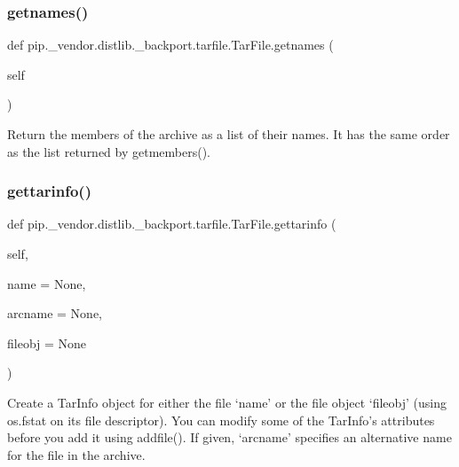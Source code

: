 \subsubsection{\texorpdfstring{getnames()}{getnames()}}
{\footnotesize\ttfamily def pip.\+\_\+vendor.\+distlib.\+\_\+backport.\+tarfile.\+Tar\+File.\+getnames (\begin{DoxyParamCaption}\item[{}]{self }\end{DoxyParamCaption})}

\begin{DoxyVerb}Return the members of the archive as a list of their names. It has
   the same order as the list returned by getmembers().
\end{DoxyVerb}
 \mbox{\label{classpip_1_1__vendor_1_1distlib_1_1__backport_1_1tarfile_1_1TarFile_aa64c5b98909e7c3064cbb52e5025794e}} 
\subsubsection{\texorpdfstring{gettarinfo()}{gettarinfo()}}
{\footnotesize\ttfamily def pip.\+\_\+vendor.\+distlib.\+\_\+backport.\+tarfile.\+Tar\+File.\+gettarinfo (\begin{DoxyParamCaption}\item[{}]{self,  }\item[{}]{name = {\ttfamily None},  }\item[{}]{arcname = {\ttfamily None},  }\item[{}]{fileobj = {\ttfamily None} }\end{DoxyParamCaption})}

\begin{DoxyVerb}Create a TarInfo object for either the file `name' or the file
   object `fileobj' (using os.fstat on its file descriptor). You can
   modify some of the TarInfo's attributes before you add it using
   addfile(). If given, `arcname' specifies an alternative name for the
   file in the archive.
\end{DoxyVerb}
 \mbox{\label{classpip_1_1__vendor_1_1distlib_1_1__backport_1_1tarfile_1_1TarFile_a36f82ac3edac63fcc7f57f04375c9a0f}} 

